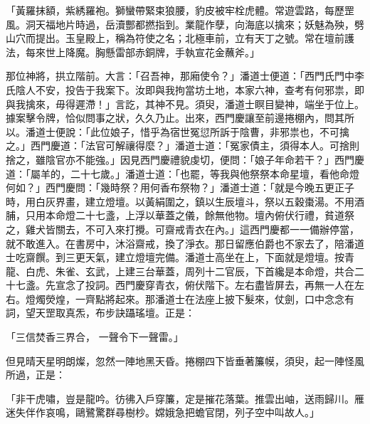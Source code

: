 \begin{showcontents}{}
「黃羅抹額，紫綉羅袍。獅蠻帶緊束狼腰，豹皮被牢栓虎體。常遊雲路，每歷罡風。洞天福地片時過，岳瀆酆都撚指到。業龍作孽，向海底以擒來；妖魅為殃，劈山穴而提出。玉皇殿上，稱為符使之名；北極車前，立有天丁之號。常在壇前護法，每來世上降魔。胸懸雷部赤銅牌，手執宣花金蘸斧。」

那位神將，拱立階前。大言：「召吾神，那廂使令？」潘道士便道：「西門氏門中李氏陰人不安，投告于我案下。汝即與我拘當坊土地，本家六神，查考有何邪祟，即與我擒來，毋得遲滯！」言訖，其神不見。須臾，潘道士瞑目變神，端坐于位上。據案擊令牌，恰似問事之狀，久久乃止。出來，西門慶讓至前邊捲棚內，問其所以。潘道士便說：「此位娘子，惜乎為宿世冤愆所訴于陰曹，非邪祟也，不可擒之。」西門慶道：「法官可解禳得麼？」潘道士道：「冤家債主，須得本人。可捨則捨之，雖陰官亦不能強。」因見西門慶禮貌虔切，便問：「娘子年命若干？」西門慶道：「屬羊的，二十七歲。」潘道士道：「也罷，等我與他祭祭本命星壇，看他命燈何如？」西門慶問：「幾時祭？用何香布祭物？」潘道士道：「就是今晚五更正子時，用白灰界畫，建立燈壇。以黃絹圍之，鎮以生辰壇斗，祭以五穀棗湯。不用酒脯，只用本命燈二十七盞，上浮以華蓋之儀，餘無他物。壇內俯伏行禮，貧道祭之，雞犬皆關去，不可入來打攪。可齋戒青衣在內。」這西門慶都一一備辦停當，就不敢進入。在書房中，沐浴齋戒，換了淨衣。那日留應伯爵也不家去了，陪潘道士吃齋饌。到三更天氣，建立燈壇完備。潘道士高坐在上，下面就是燈壇。按青龍、白虎、朱雀、玄武，上建三台華蓋，周列十二官辰，下首纔是本命燈，共合二十七盞。先宣念了投詞。西門慶穿青衣，俯伏階下。左右盡皆屏去，再無一人在左右。燈燭熒煌，一齊點將起來。那潘道士在法座上披下髮來，仗劍，口中念念有詞，望天罡取真炁，布步訣躡瑤壇。正是：

「三信焚香三界合，  一聲令下一聲雷。」

但見晴天星明朗燦，忽然一陣地黑天昏。捲棚四下皆垂著簾幙，須臾，起一陣怪風所過，正是：

「非干虎嘯，豈是龍吟。彷彿入戶穿簾，定是摧花落葉。推雲出岫，送雨歸川。雁迷失伴作哀鳴，鷗鷺驚群尋樹杪。嫦娥急把蟾官閉，列子空中叫故人。」


\end{showcontents}
